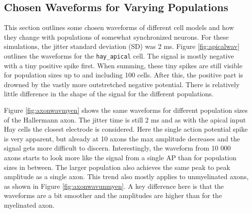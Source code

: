 \documentclass[final, a4paper,masters,en,listoffigures,listoftables,norwegiandates]{NMBU}
\begin{document}
\subsection{Chosen Waveforms for Varying Populations}\label{subsec:waveforms}
This section outlines some chosen waveforms of different cell models and how they change with populations of somewhat synchronized neurons. For these simulations, the jitter standard deviation (SD) was 2 ms. Figure \ref{fig:apicalwav} outlines the waveforms for the \texttt{hay\_apical} cell. The signal is mostly negative with a tiny positive spike first. When summing, these tiny spikes are still visible for population sizes up to and including 100 cells. After this, the positive part is drowned by the vastly more outstretched negative potential. There is relatively little difference in the shape of the signal for the different populations.

Figure \ref{fig:axonwavmyen} shows the same waveforms for different population sizes of the Hallermann axon. The jitter time is still 2 ms and as with the apical input Hay cells the closest electrode is considered. Here the single action potential spike is very apparent, but already at 10 axons the max amplitude decreases and the signal gets more difficult to discern. Interestingly, the waveform from 10 000 axons starts to look more like the signal from a single AP than for population sizes in between. The larger population also achieves the same peak to peak amplitude as a single axon. This trend also mostly applies to unmyelinated axons, as shown in Figure \ref{fig:axonwavunmyen}. A key difference here is that the waveforms are a bit smoother and the amplitudes are higher than for the myelinated axon. 
\end{document}
